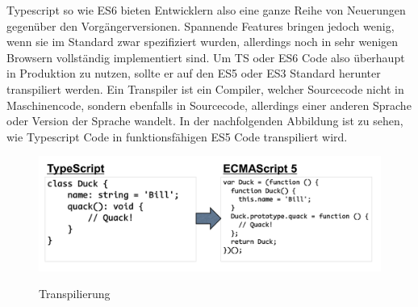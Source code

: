 Typescript so wie ES6 bieten Entwicklern also eine ganze Reihe von Neuerungen gegenüber den Vorgängerversionen.
Spannende Features bringen jedoch wenig, wenn sie im Standard zwar spezifiziert wurden,
allerdings noch in sehr wenigen Browsern vollständig implementiert sind.
Um TS oder ES6 Code also überhaupt in Produktion zu nutzen, sollte er auf den ES5 oder ES3
Standard herunter transpiliert werden.
Ein Transpiler ist ein Compiler, welcher Sourcecode nicht in Maschinencode, sondern ebenfalls in Sourcecode,
allerdings einer anderen Sprache oder Version der Sprache wandelt.\cite{Introduction-to-the-Typescript-Transpiler}
In der nachfolgenden Abbildung ist zu sehen, wie Typescript Code in funktionsfähigen ES5 Code transpiliert wird.

\begin{figure}[ht]
 \centering
 \includegraphics[width=0.8\linewidth]{kapitel2/Introduction-transpiler.png}
 \caption{Transpilierung}\cite[27]{ng-Book-2}
\end{figure}
